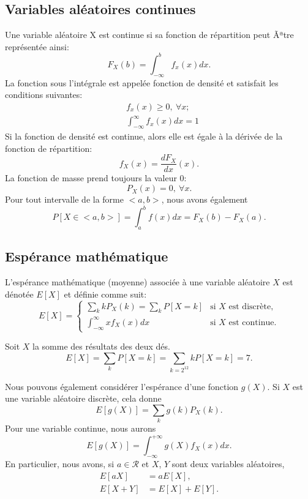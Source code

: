 \subsection{Variables aléatoires continues}

Une variable aléatoire X est continue si sa fonction de répartition peut Ãªtre représentée ainsi:
\[
F_X(b) = \int_{-\infty}^b f_x(x) dx.
\]
La fonction sous l'intégrale est appelée fonction de densité et satisfait les conditions suivantes:
\begin{align*}
& f_x(x) \geq 0,\ \forall x; \\
& \int_{-\infty}^{\infty} f_x(x) dx = 1
\end{align*}
Si la fonction de densité est continue, alors elle est égale à la dérivée de la fonction de répartition:
\[
f_X(x) = \frac{dF_X}{dx}(x).
\]
La fonction de masse prend toujours la valeur 0:
\[
P_X(x) = 0,\ \forall x.
\]
Pour tout intervalle de la forme $<a,b>$, nous avons également
\[
P[X \in <a,b> ] = \int_a^b f (x)dx = F_X(b) - F_X(a).
\]

\subsection{Espérance mathématique}

L'espérance mathématique  (moyenne) associée à une variable aléatoire $X$ est dénotée $E[X]$ et définie comme suit:
\[
E[X] = \begin{cases}
\sum_k kP_X(k) = \sum_k P[X=k] & \mbox{si $X$ est discrète},\\
\int_{-\infty}^{\infty} x f_X(x) dx & \mbox{si $X$ est continue}.
\end{cases}
\]

\begin{example}
Soit $X$ la somme des résultats des deux dés.
\[
E[X] = \sum_k P[X=k] = \sum_{k=2^12} kP[X=k] = 7.
\]
\end{example}

Nous pouvons également considérer l'espérance d'une fonction $g(X)$.
Si $X$ est une variable aléatoire discrète, cela donne
\[
E[g(X)] = \sum_k g(k) P_X(k).
\]
Pour une variable continue, nous aurons
\[
E[g(X)] = \int_{-\infty}^{+\infty} g(X) f_X(x) dx.
\]
En particulier, nous avons, si $a \in \mathcal{R}$ et $X$, $Y$ sont deux variables aléatoires,
\begin{align*}
E[aX] &= aE[X], \\
E[X+Y] &= E[X] + E[Y].
\end{align*}

